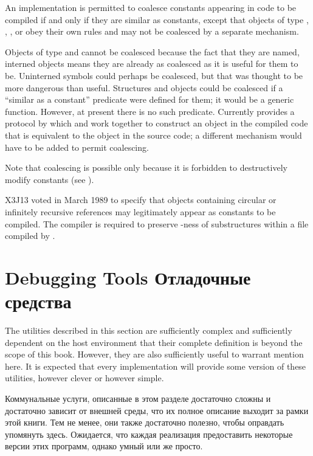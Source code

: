 An implementation is permitted to coalesce constants
appearing in code to be compiled if and only if they are similar as
constants, except that objects of type , ,
, or  obey their own rules
and may not be coalesced by a separate mechanism.

\beforenoterule
\begin{rationale}
Objects of type  and  cannot be coalesced because the fact
that they are named, interned objects means they are already as
coalesced as it is useful for them to be.  Uninterned symbols could
perhaps be coalesced, but that was thought to be more dangerous than
useful.  Structures and objects could be
coalesced if a ``similar as a constant'' predicate were defined for them;
it would be a generic function.  However, at present there is no such
predicate.  Currently  provides a protocol by which
 and  work together to construct an object in the
compiled code that is equivalent to the object in the source code;
a different mechanism would have to be added to permit coalescing.
\end{rationale}
\afternoterule

Note that coalescing is possible only because it is forbidden to
destructively modify constants  (see ).

   X3J13 voted in March 1989  to specify
that objects containing circular or infinitely recursive references may legitimately
appear as constants to be compiled.  The compiler is
required to preserve -ness of substructures within a file compiled
by .

\section{Debugging Tools Отладочные средства}

The utilities described in this section are sufficiently complex
and sufficiently dependent on the host environment that their
complete definition is beyond the scope of this book.
However, they are also sufficiently
useful to warrant mention here.  It is expected that
every implementation will
provide some version of these utilities, however clever or however simple.

Коммунальные услуги, описанные в этом разделе достаточно сложны
и достаточно зависит от внешней среды, что их
полное описание выходит за рамки этой книги.
Тем не менее, они также достаточно
полезно, чтобы оправдать упомянуть здесь. Ожидается, что
каждая реализация
предоставить некоторые версии этих программ, однако умный или же просто.


